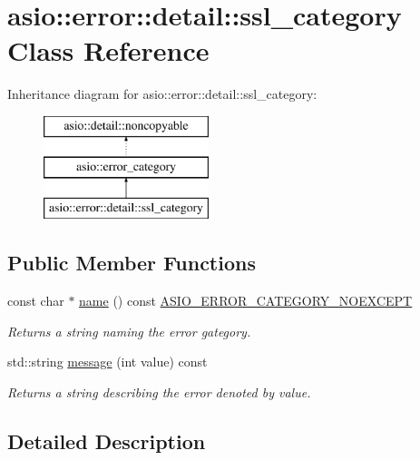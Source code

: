 \hypertarget{classasio_1_1error_1_1detail_1_1ssl__category}{}\section{asio\+:\+:error\+:\+:detail\+:\+:ssl\+\_\+category Class Reference}
\label{classasio_1_1error_1_1detail_1_1ssl__category}
Inheritance diagram for asio\+:\+:error\+:\+:detail\+:\+:ssl\+\_\+category\+:\begin{figure}[H]
\begin{center}
\leavevmode
\includegraphics[height=3.000000cm]{classasio_1_1error_1_1detail_1_1ssl__category}
\end{center}
\end{figure}
\subsection*{Public Member Functions}
\begin{DoxyCompactItemize}
\item 
const char $\ast$ \hyperlink{classasio_1_1error_1_1detail_1_1ssl__category_acabd06f67b8f4f6a34b1e6fb0225901c}{name} () const \hyperlink{config_8hpp_a1e51af6137c0e4e4d686921037649e74}{A\+S\+I\+O\+\_\+\+E\+R\+R\+O\+R\+\_\+\+C\+A\+T\+E\+G\+O\+R\+Y\+\_\+\+N\+O\+E\+X\+C\+E\+P\+T}
\begin{DoxyCompactList}\small\item\em Returns a string naming the error gategory. \end{DoxyCompactList}\item 
std\+::string \hyperlink{classasio_1_1error_1_1detail_1_1ssl__category_a0c1e12ba6fc3c339fbf74b7fb6245281}{message} (int value) const 
\begin{DoxyCompactList}\small\item\em Returns a string describing the error denoted by {\ttfamily value}. \end{DoxyCompactList}\end{DoxyCompactItemize}


\subsection{Detailed Description}


